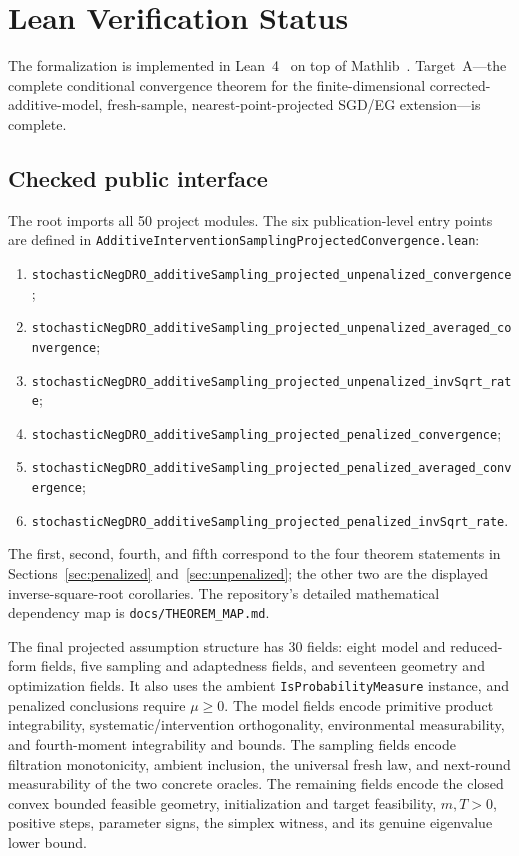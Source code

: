 \section{Lean Verification Status}
\label{sec:verification}

The formalization is implemented in Lean~4~\cite{lean4} on top of
Mathlib~\cite{mathlib}.  Target~A---the complete conditional convergence
theorem for the finite-dimensional corrected-additive-model, fresh-sample,
nearest-point-projected SGD/EG extension---is complete.

\subsection{Checked public interface}

The root imports all 50 project modules.  The six publication-level entry
points are defined in
\texttt{AdditiveInterventionSamplingProjectedConvergence.lean}:
\begin{enumerate}[leftmargin=*]
  \item \texttt{stochasticNegDRO\_additiveSampling\_projected\_unpenalized\_convergence};
  \item \texttt{stochasticNegDRO\_additiveSampling\_projected\_unpenalized\_averaged\_convergence};
  \item \texttt{stochasticNegDRO\_additiveSampling\_projected\_unpenalized\_invSqrt\_rate};
  \item \texttt{stochasticNegDRO\_additiveSampling\_projected\_penalized\_convergence};
  \item \texttt{stochasticNegDRO\_additiveSampling\_projected\_penalized\_averaged\_convergence};
  \item \texttt{stochasticNegDRO\_additiveSampling\_projected\_penalized\_invSqrt\_rate}.
\end{enumerate}
The first, second, fourth, and fifth correspond to the four theorem statements
in Sections~\ref{sec:penalized} and~\ref{sec:unpenalized}; the other two are
the displayed inverse-square-root corollaries.  The repository's detailed
mathematical dependency map is \texttt{docs/THEOREM\_MAP.md}.

The final projected assumption structure has 30 fields: eight model and
reduced-form fields, five sampling and adaptedness fields, and seventeen
geometry and optimization fields.  It also uses the ambient
\texttt{IsProbabilityMeasure} instance, and penalized conclusions require
$\mu\ge0$.  The model fields encode primitive product integrability,
systematic/intervention orthogonality, environmental measurability, and
fourth-moment integrability and bounds.  The sampling fields encode filtration
monotonicity, ambient inclusion, the universal fresh law, and next-round
measurability of the two concrete oracles.  The remaining fields encode the
closed convex bounded feasible geometry, initialization and target
feasibility, $m,T>0$, positive steps, parameter signs, the simplex
witness, and its genuine eigenvalue lower bound.

